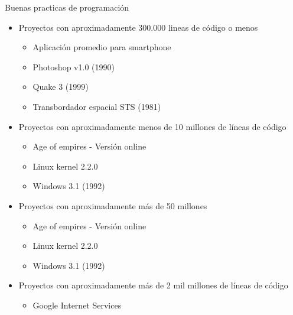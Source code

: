 \documentclass[xcolor=pdftex,table,11pt]{beamer}
\begin{document}
\begin{frame}{Buenas practicas de programación}
\begin{itemize}

\item<1-> Proyectos con aproximadamente 300.000 lineas de código o menos
\begin{itemize}
\item<1->  Aplicación promedio para smartphone
\item<2->  Photoshop v1.0 (1990)
\item<3->  Quake 3 (1999)
\item<4->  Transbordador espacial STS (1981)
\end{itemize}

\item<5-> Proyectos con aproximadamente menos de 10 millones de líneas de código
\begin{itemize}
\item<6->  Age of empires - Versión online
\item<7->  Linux kernel 2.2.0
\item<8->  Windows 3.1 (1992)
\end{itemize}


\item<9-> Proyectos con aproximadamente más de 50 millones
\begin{itemize}
\item<10->  Age of empires - Versión online
\item<11->  Linux kernel 2.2.0
\item<12->  Windows 3.1 (1992)
\end{itemize}



\item<13-> Proyectos con aproximadamente más de 2 mil millones de líneas de código
\begin{itemize}
\item<14->  Google Internet Services
\end{itemize}


\end{itemize}



\end{frame}
\end{document}
